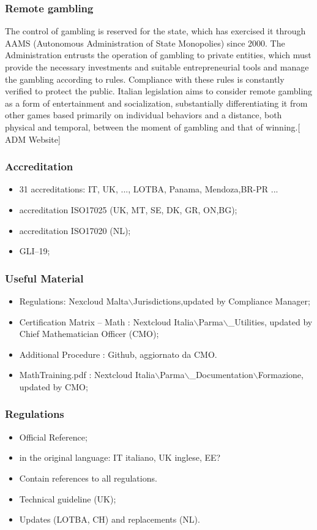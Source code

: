 \documentclass{beamer}
\begin{document}
\begin{frame}
\frametitle{Remote gambling}
The control of gambling is reserved for the state, which has exercised it through AAMS (Autonomous Administration of State Monopolies) since 2000. The Administration entrusts the operation of gambling to private entities, which must provide the necessary investments and suitable entrepreneurial tools and manage the gambling according to rules. Compliance with these rules is constantly verified to protect the public. Italian legislation aims to consider remote gambling as a form of entertainment and socialization, substantially differentiating it from other games based primarily on individual behaviors and a distance, both physical and temporal, between the moment of gambling and that of winning.[ ADM Website]
\end{frame}

\begin{frame}
\frametitle{Accreditation}
\begin{itemize}
\item<1-> 31 accreditations: IT, UK, ..., LOTBA, Panama, Mendoza,BR-PR ...
\item<2-> accreditation ISO17025 (UK, MT, SE, DK, GR, ON,BG);
\item<3-> accreditation ISO17020 (NL);
\item<4-> GLI--19;
\end{itemize}
\end{frame}

\begin{frame}
\frametitle{Useful Material}
\begin{itemize}
\item<1-> Regulations: Nexcloud Malta$\backslash$Jurisdictions,updated by Compliance Manager;
\item<2-> Certification Matrix -- Math : Nextcloud Italia$\backslash$Parma$\backslash$\_Utilities, updated by Chief Mathematician Officer (CMO);
\item<3-> Additional Procedure : Github, aggiornato da CMO.
\item<4-> MathTraining.pdf : Nextcloud Italia$\backslash$Parma$\backslash$\_Documentation$\backslash$Formazione, updated by CMO;
\end{itemize}
\end{frame}

\begin{frame}
\frametitle{Regulations}
\begin{itemize}
\item<1-> Official Reference;
\item<2-> in the original language: IT italiano, UK inglese, EE?
\item<3-> Contain references to all regulations.
\item<4-> Technical guideline (UK);
\item<5-> Updates (LOTBA, CH) and replacements (NL).
\end{itemize}
\end{frame}
\end{document}
